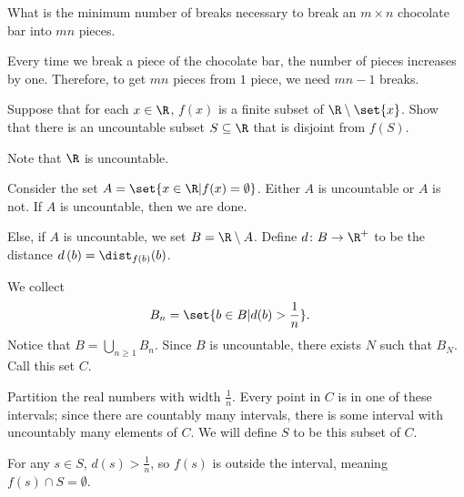 \documentclass[10pt]{mypackage}
\begin{document}
\begin{problem}
  What is the minimum number of breaks necessary to break an $m\times n$ chocolate bar into $mn$ pieces.
\end{problem}
\begin{solution}
  Every time we break a piece of the chocolate bar, the number of pieces increases by one. Therefore, to get $mn$ pieces from $1$ piece, we need $mn-1$ breaks.
\end{solution}
\begin{problem}
  Suppose that for each $x\in \R$, $f(x)$ is a finite subset of $\R\setminus \set{x}$. Show that there is an uncountable subset $S\subseteq \R$ that is disjoint from $f(S)$.
\end{problem}
\begin{solution}
  Note that $\R$ is uncountable.\newline

  Consider the set $A = \set{x \in \R | f(x) = \emptyset}$. Either $A$ is uncountable or $A$ is not. If $A$ is uncountable, then we are done.\newline

  Else, if $A$ is uncountable, we set $B = \R\setminus A$. Define $d\colon B\rightarrow \R^{+}$ to be the distance $d\left( b \right) = \dist_{f(b)}(b)$.

  We collect
  \begin{align*}
    B_n &= \set{b\in B | d(b) > \frac{1}{n}}.
  \end{align*}
  Notice that $B = \bigcup_{n\geq 1}B_n$. Since $B$ is uncountable, there exists $N$ such that $B_N$. Call this set $C$.\newline

  Partition the real numbers with width $\frac{1}{n}$. Every point in $C$ is in one of these intervals; since there are countably many intervals, there is some interval with uncountably many elements of $C$. We will define $S$ to be this subset of $C$.\newline

  For any $s\in S$, $d(s) > \frac{1}{n}$, so $f(s)$ is outside the interval, meaning $f(s)\cap S = \emptyset$.
\end{solution}
\end{document}
